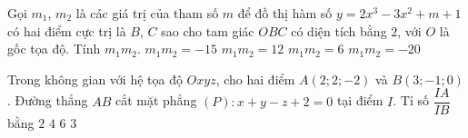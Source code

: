 \begin{ex}%
Gọi $m_1$, $m_2$ là các giá trị của tham số $m$ để đồ thị hàm số $y=2x^3-3x^2+m+1$ có hai điểm cực trị là $B$, $C$ sao cho tam giác $OBC$ có diện tích bằng $2$, với $O$ là gốc tọa độ. Tính $m_1m_2$.
\choice
{\True $m_1m_2=-15$}
{$m_1m_2=12$}
{$m_1m_2=6$}
{$m_1m_2=-20$}
\end{ex}

\begin{ex}%
Trong không gian với hệ tọa độ $Oxyz$, cho hai điểm $A(2;2;-2)$ và $B(3;-1;0)$. Đường thẳng $AB$ cắt mặt phẳng $(P)\colon x+y-z+2=0$ tại điểm $I$. Tỉ số $\dfrac{IA}{IB}$ bằng
\choice
{\True $2$}
{$4$}
{$6$}
{$3$}
\end{ex}

